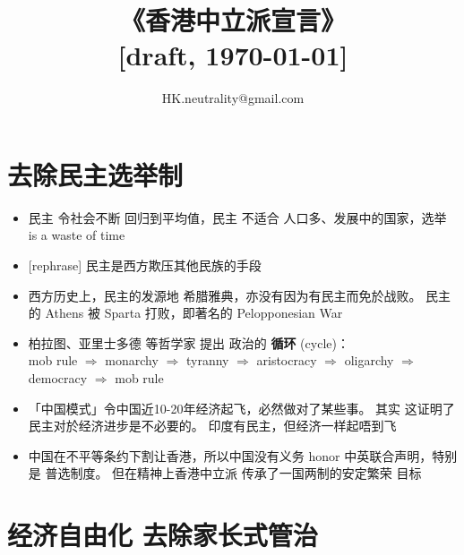 

\usepackage[backend=biber]{biblatex}


\usepackage[CJKspace]{xeCJK}

\title{《香港中立派宣言》\\{\footnotesize\color{red}[draft, \today]} }
\author{HK.neutrality@gmail.com}
\date{}

\setcounter{secnumdepth}{0}		%


\maketitle

\section{去除民主选举制}

\begin{itemize}
	\item 民主 令社会不断 回归到平均值，民主 不适合 人口多、发展中的国家，选举 is a waste of time

	\item {\color{red}[rephrase]} 民主是西方欺压其他民族的手段

	\item 西方历史上，民主的发源地 希腊雅典，亦没有因为有民主而免於战败。 民主的 Athens 被 Sparta 打败，即著名的 Pelopponesian War

	\item 柏拉图、亚里士多德 等哲学家 提出 政治的 \textbf{循环} (cycle)： \\
		mob rule $\Rightarrow$ monarchy $\Rightarrow$ tyranny $\Rightarrow$ aristocracy $\Rightarrow$ oligarchy $\Rightarrow$ democracy $\Rightarrow$ mob rule 

	\item 「中国模式」令中国近10-20年经济起飞，必然做对了某些事。 其实 这证明了民主对於经济进步是不必要的。 印度有民主，但经济一样起唔到飞
	
	\item 中国在不平等条约下割让香港，所以中国没有义务 honor 中英联合声明，特别是 普选制度。 但在精神上香港中立派 传承了一国两制的安定繁荣 目标
	
\end{itemize}

\section{经济自由化 \textbullet 去除家长式管治}

